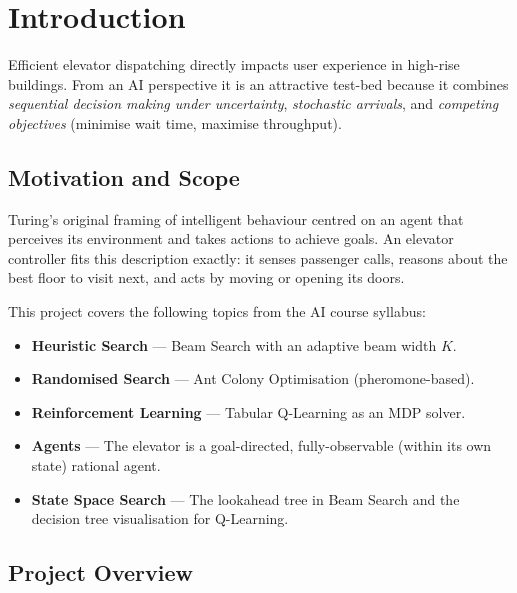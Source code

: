\documentclass[12pt,a4paper]{article}
\begin{document}
\tableofcontents
\newpage

\section{Introduction}

Efficient elevator dispatching directly impacts user experience in high-rise buildings.
From an AI perspective it is an attractive test-bed because it combines
\emph{sequential decision making under uncertainty},
\emph{stochastic arrivals}, and
\emph{competing objectives} (minimise wait time, maximise throughput).

\subsection{Motivation and Scope}

Turing's original framing of intelligent behaviour centred on an agent that perceives
its environment and takes actions to achieve goals.  An elevator controller fits this
description exactly: it senses passenger calls, reasons about the best floor to visit
next, and acts by moving or opening its doors.

This project covers the following topics from the AI course syllabus:

\begin{itemize}[leftmargin=2em]
    \item \textbf{Heuristic Search} — Beam Search with an adaptive beam width $K$.
    \item \textbf{Randomised Search} — Ant Colony Optimisation (pheromone-based).
    \item \textbf{Reinforcement Learning} — Tabular Q-Learning as an MDP solver.
    \item \textbf{Agents} — The elevator is a goal-directed, fully-observable (within
          its own state) rational agent.
    \item \textbf{State Space Search} — The lookahead tree in Beam Search and the
          decision tree visualisation for Q-Learning.
\end{itemize}

\subsection{Project Overview}
\end{document}

